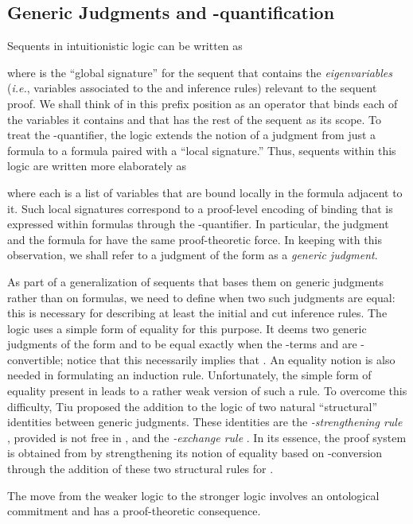 \subsection{Generic Judgments and -quantification}

Sequents in intuitionistic logic can be written as

where  is the ``global signature'' for the sequent that
contains the {\em eigenvariables} ({\em i.e.}, variables associated to
the  and  inference rules) relevant to the sequent
proof. We shall think of  in this prefix position as an
operator that binds each of the variables it contains and that has the
rest of the sequent as its scope. To treat the -quantifier,
the \foldnb logic \cite{miller05tocl} extends the notion of a judgment
from just a formula to a formula paired with a ``local signature.''
Thus, sequents within this logic are written more elaborately as

where each  is a list of variables that are
bound locally in the formula adjacent to it.  Such local signatures
correspond to a proof-level encoding of binding that is expressed
within formulas through the -quantifier. In particular, the
judgment  and the formula  for  have the same proof-theoretic
force. In keeping with this observation, we shall refer to a judgment
of the form  as a {\it generic judgment}.

As part of a generalization of sequents that bases them on generic
judgments rather than on formulas, we need to
define when two such judgments are equal: this is necessary
for describing at least the initial and cut inference rules.  The
\foldnb logic \cite{miller05tocl} uses a simple form of equality for
this purpose. It deems two generic judgments of the form
 and 
to be equal exactly when the -terms  and  are
-convertible; notice that this necessarily implies that
. An equality notion is also needed in formulating an induction
rule. Unfortunately, the simple form of equality present in \foldnb
leads to a rather weak version of such a rule. To overcome this difficulty,
Tiu proposed the addition to the logic of two natural ``structural''
identities between generic judgments.
These identities are the {\em -strengthening rule}
, provided  is not free in , and the
{\em -exchange rule} .  In its essence, the \LG proof system \cite{tiu06lfmtp} is
obtained from \foldnb by strengthening its notion of equality based on
-conversion through the addition of these two structural
rules for .


The move from the weaker
logic \foldnb to the stronger logic \LG involves an ontological
commitment and has a proof-theoretic consequence.

